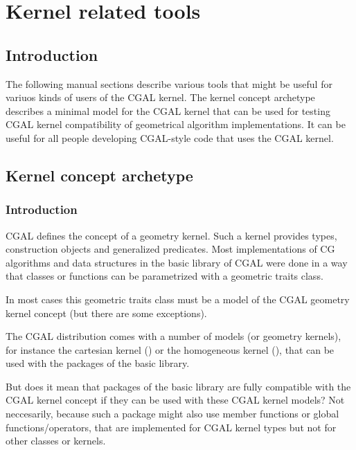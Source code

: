 \chapter{Kernel related tools}

\section{Introduction}

The following manual sections describe various tools that might be useful for variuos kinds of users of the
CGAL kernel. The kernel concept archetype describes a minimal model for the CGAL kernel that can be used
for testing CGAL kernel compatibility of geometrical algorithm implementations. It can be useful for
all people developing CGAL-style code that uses the CGAL kernel.


\section{Kernel concept archetype}

\subsection{Introduction}

CGAL defines the concept of a geometry
kernel. Such a kernel provides types, construction objects and generalized
predicates. Most implementations of CG algorithms and data structures 
in the basic library of CGAL were done in a way that classes or functions can be
parametrized with a geometric traits class. 

In most cases this geometric traits class must be a model of the CGAL geometry kernel concept
(but there are some exceptions).

The CGAL distribution comes with a number of models (or geometry kernels), for instance
the cartesian kernel () or the homogeneous kernel (),
that can be used with the packages of the basic library.

But does it mean that packages of the basic library are fully compatible with the CGAL kernel concept
if they can be used with these CGAL kernel models? Not neccesarily, because such a package
might also use member functions or global functions/operators, that are implemented for CGAL kernel types but
not for other classes or kernels.

